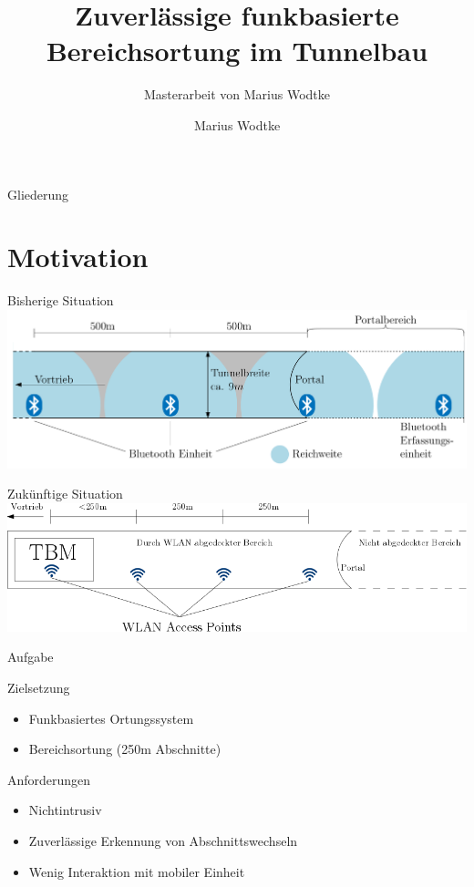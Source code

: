 \documentclass[18pt]{beamer}
\title[Funkbasierte Bereichsortung]{Zuverlässige funkbasierte
Bereichsortung im Tunnelbau}
\subtitle{Masterarbeit von Marius Wodtke}
\author{Marius Wodtke}
\institute{Instuitut für angewandte Informatik und Formale Beschreibungsverfahren}
\begin{document}

\begin{frame}
\titlepage
\end{frame}

\begin{frame}{Gliederung}
	\tableofcontents
\end{frame}

\section{Motivation}
\begin{frame}{Bisherige Situation}
	\includegraphics[width=\textwidth]{images/bisherige.png}\\
	\cite{maurer2016unterstuetzung}
\end{frame}

\begin{frame}{Zukünftige Situation}
	\includegraphics[width=\textwidth]{images/zukuenftige.png}
\end{frame}

\begin{frame}{Aufgabe}
	\begin{block}{Zielsetzung}
		\begin{itemize}
			\item Funkbasiertes Ortungssystem
			\item Bereichsortung (250m Abschnitte)
		\end{itemize}
	\end{block}


	\begin{block}{Anforderungen}
		\begin{itemize}
			\item Nichtintrusiv 
			\item Zuverlässige Erkennung von Abschnittswechseln
			\item Wenig Interaktion mit mobiler Einheit
		\end{itemize}
	\end{block}
\end{frame}
\end{document}
